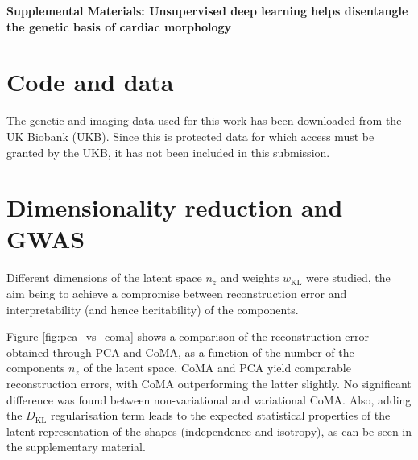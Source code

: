 \pagebreak
\begin{center}
\textbf{\large Supplemental Materials: Unsupervised deep learning helps disentangle the genetic basis of cardiac morphology}
\end{center}
\setcounter{equation}{0}
\setcounter{figure}{0}
\setcounter{table}{0}
\setcounter{page}{1}
\makeatletter
\renewcommand{\theequation}{S\arabic{equation}}
\renewcommand{\thefigure}{S\arabic{figure}}
\renewcommand{\bibnumfmt}[1]{[S#1]}
\renewcommand{\citenumfont}[1]{S#1}

\def\code#1{\texttt{#1}} 

\section*{Code and data}

The genetic and imaging data used for this work has been downloaded from the UK Biobank (UKB). Since this is protected data for which access must be granted by the UKB, it has not been included in this submission.


\section*{Dimensionality reduction and GWAS}

Different dimensions of the latent space $n_z$ and weights $w_{\textrm{KL}}$ were studied, the aim being to achieve a compromise between reconstruction error and interpretability (and hence heritability) of the components.

Figure \ref{fig:pca_vs_coma} shows a comparison of the reconstruction error obtained through PCA and CoMA, as a function of the number of the components $n_z$ of the latent space. CoMA and PCA yield comparable reconstruction errors, with CoMA outperforming the latter slightly. No significant difference was found between non-variational and variational CoMA.
Also, adding the $D_\textrm{KL}$ regularisation term leads to the expected statistical properties of the latent representation of the shapes (independence and isotropy), as can be seen in the supplementary material.

